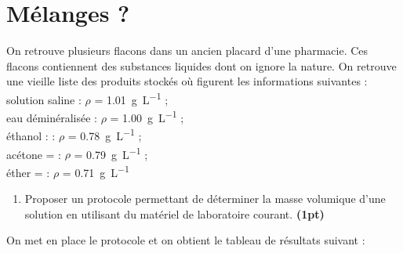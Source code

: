 \documentclass[a4paper,12pt,fleqn]{article}%
\begin{document}
\maketitle

\section{Mélanges ?}
On retrouve plusieurs flacons dans un ancien placard d'une pharmacie. Ces flacons contiennent des substances liquides dont on ignore la nature. On retrouve une vieille liste des produits stockés où figurent les informations suivantes : \\ solution saline : $\rho$ = \SI{1,01}{\gram\per\liter} ;\\ eau déminéralisée : $\rho$ = \SI{1,00}{\gram\per\liter} ;\\ éthanol : : $\rho$ = \SI{0,78}{\gram\per\liter} ;\\ acétone = : $\rho$ = \SI{0,79}{\gram\per\liter} ;\\ éther = : $\rho$ = \SI{0,71}{\gram\per\liter}
\begin{enumerate}
	\item Proposer un protocole permettant de déterminer la masse volumique d'une solution en utilisant du matériel de laboratoire courant. \textbf{(1pt)}
\end{enumerate}

On met en place le protocole et on obtient le tableau de résultats suivant :
\end{document}
